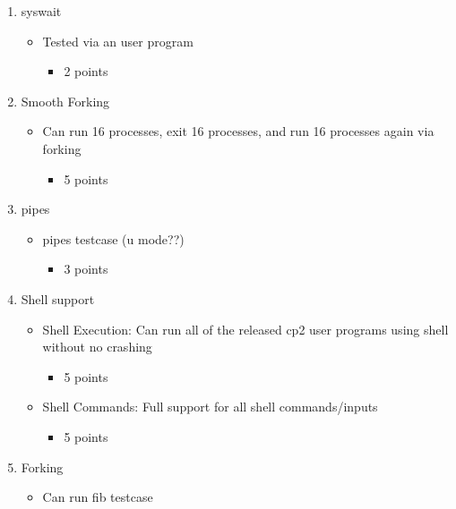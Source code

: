 \documentclass{article}
\begin{document}
\begin{enumerate}
    \item syswait 
        \begin {itemize}
            \item Tested via an user program
            \begin {itemize}
                \item 2 points
            \end{itemize}
        \end{itemize}
    \item Smooth Forking
        \begin {itemize}
            \item Can run 16 processes, exit 16 processes, and run 16 processes again via forking
            \begin {itemize}
                \item 5 points
            \end{itemize}
        \end{itemize}
    \item pipes 
        \begin {itemize}
            \item pipes testcase   (u mode??)
            \begin {itemize}
                \item 3 points
            \end{itemize}
        \end{itemize}
    \item Shell support
        \begin {itemize}
            \item Shell Execution: Can run all of the released cp2 user programs using shell without no crashing
            \begin {itemize}
                \item 5 points
            \end{itemize}
            \item Shell Commands: Full support for all shell commands/inputs
            \begin {itemize}
                \item 5 points
            \end{itemize}
        \end{itemize}
    \item Forking 	
        \begin {itemize}
            \item Can run fib testcase 

\end{itemize}
\end{enumerate}
\end{document}
